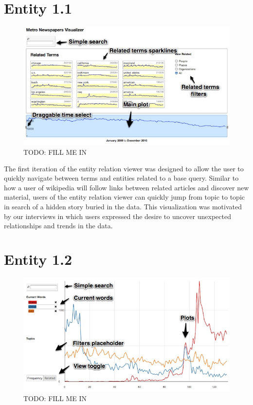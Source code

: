 \section{Entity 1.1}

\begin{figure}[htb]
  \centerline{
    \includegraphics[scale=0.28]{figures/relation-0.jpg}
  }
  \caption{TODO: FILL ME IN}
  \label{fig:explorer-0}
\end{figure}

The first iteration of the entity relation viewer was designed to allow the user to quickly navigate between terms and entities related to a base query. Similar to how a user of wikipedia will follow links between related articles and discover new material, users of the entity relation viewer can quickly jump from topic to topic in search of a hidden story buried in the data. This visualization was motivated by our interviews in which users expressed the desire to uncover unexpected relationships and trends in the data.

\section{Entity 1.2}


\begin{figure}[htb]
  \centerline{
    \includegraphics[scale=0.28]{figures/relation-1-a.jpg}
  }
  \caption{TODO: FILL ME IN}
  \label{fig:explorer-1-a}
\end{figure}


